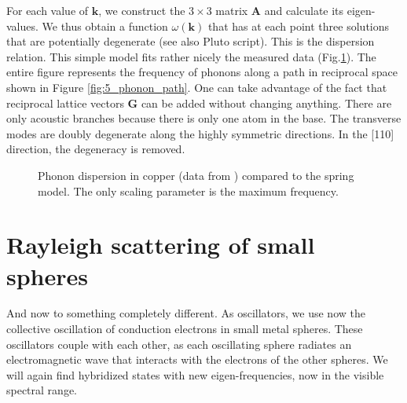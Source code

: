 \begin{marginfigure}
\caption{Points of high symmetry in the Brillouin zone are marked by large letters. the $\Gamma$ point is the center of the BZ, so $k=0$. The path $\Gamma$--X--K--$\Gamma$--L takes advantage of the symmetry of the Brillouin zone. \label{fig:5_phonon_path} }
\end{marginfigure}

For each value of $\mathbf{k}$, we construct the $3 \times 3$ matrix $\mathbf{A}$ and calculate its eigen-values. We thus obtain a function $\omega(\mathbf{k})$ that has at each point three solutions that are  potentially degenerate (see also Pluto script). This is the dispersion relation. This simple model fits rather nicely the measured data (Fig.\ref{fig:5_phonon_copper}). The entire figure represents the frequency of phonons along a path in reciprocal space shown in Figure \ref{fig:5_phonon_path}. One can take advantage of the fact that reciprocal lattice vectors $\mathbf{G}$ can be added without changing anything. There are only acoustic branches because there is only one atom in the base. The transverse modes are doubly degenerate along the highly symmetric directions. In the [110] direction, the degeneracy is removed.
 

\begin{figure}
\caption{Phonon dispersion in copper (data from \cite{Svensson_cu}) compared to the spring model. The only scaling parameter is the maximum frequency. }
\label{fig:5_phonon_copper}
\end{figure}



\section{Rayleigh scattering of small spheres}


And now to something completely different. As oscillators, we use now the collective oscillation of conduction electrons in small metal spheres. These oscillators couple with each other, as each oscillating sphere radiates an electromagnetic wave that interacts with the electrons of the other spheres. We will again find hybridized states with new eigen-frequencies, now in the visible spectral range.

